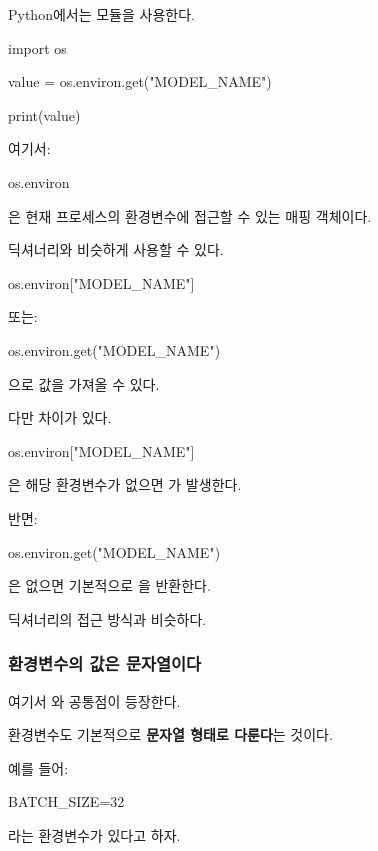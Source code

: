 Python에서는  모듈을 사용한다.

\begin{dhkcode}
import os

value = os.environ.get("MODEL_NAME")

print(value)
\end{dhkcode}

여기서:

\begin{dhkcode}
os.environ
\end{dhkcode}

은 현재 프로세스의 환경변수에 접근할 수 있는 매핑 객체이다.

딕셔너리와 비슷하게 사용할 수 있다.

\begin{dhkcode}
os.environ["MODEL_NAME"]
\end{dhkcode}

또는:

\begin{dhkcode}
os.environ.get("MODEL_NAME")
\end{dhkcode}

으로 값을 가져올 수 있다.

다만 차이가 있다.

\begin{dhkcode}
os.environ["MODEL_NAME"]
\end{dhkcode}

은 해당 환경변수가 없으면 가 발생한다.

반면:

\begin{dhkcode}
os.environ.get("MODEL_NAME")
\end{dhkcode}

은 없으면 기본적으로 을 반환한다.

딕셔너리의 접근 방식과 비슷하다.

\subsubsection{환경변수의 값은 문자열이다}

여기서 와 공통점이 등장한다.

환경변수도 기본적으로 \textbf{문자열 형태로 다룬다}는 것이다.

예를 들어:

\begin{dhkcode}
BATCH_SIZE=32
\end{dhkcode}

라는 환경변수가 있다고 하자.

